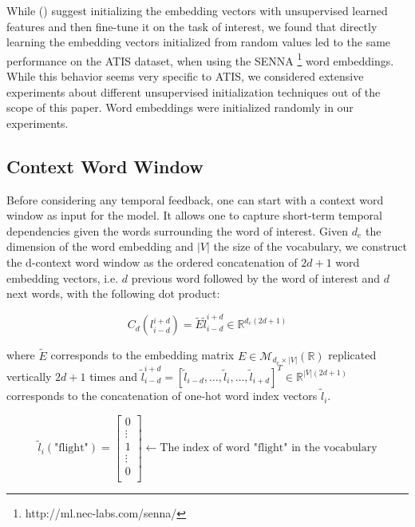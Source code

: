 While (\cite{rnn15, rnn24}) suggest initializing the embedding vectors with unsupervised
learned features and then fine-tune it on the task of interest, we found that
directly learning the embedding vectors initialized from random values led to
the same performance on the ATIS dataset, when using the SENNA
\footnote{http://ml.nec-labs.com/senna/} word embeddings. While this behavior
seems very specific to ATIS, we considered extensive experiments about
different unsupervised initialization techniques out of the scope of this
paper. Word embeddings were initialized randomly in our experiments.

\subsection{Context Word Window}

Before considering any temporal feedback, one can start with a context word
window as input for the model. It allows one to capture short-term temporal
dependencies given the words surrounding the word of interest. Given $d_e$ the
dimension of the word embedding and $|V|$ the size of the vocabulary, we
construct the d-context word window as the ordered concatenation of $2d+1$ word
embedding vectors, i.e. $d$ previous word followed by the word of interest and $d$
next words, with the following dot product:

\begin{equation}
C_{d}(l_{i-d}^{i+d}) = \tilde{E}\tilde{l}_{i-d}^{i+d}\in\mathbb{R}^{d_{e} (2d+1)}
\end{equation}

where $\tilde{E}$ corresponds to the embedding matrix
$E\in\mathcal{M}_{d_e\times|V|}(\mathbb{R})$ replicated vertically $2d+1$ times
and $\tilde{l}_{i-d}^{i+d}= [
\tilde{l}_{i-d},\dots,\tilde{l}_i,\dots,\tilde{l}_{i+d}]^T\in\mathbb{R}^{|V|(2d+1)}$
corresponds to the concatenation of one-hot word index vectors $\tilde{l}_i$.

\begin{equation}
\tilde{l}_{i}(\textrm{"flight"}) =
\begin{bmatrix}
0\\
\vdots\\
1\\
\vdots\\
0\\
\end{bmatrix} 
\leftarrow \textrm{The index of word "flight" in the vocabulary}
\end{equation}

